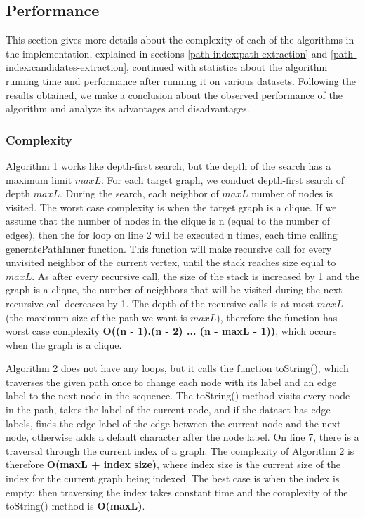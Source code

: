 \documentclass{l4proj}
\theoremstyle{definition}
\begin{document}
\subsection{Performance}
This section gives more details about the complexity of each of the algorithms in the implementation, explained in sections \ref{path-index:path-extraction} and \ref{path-index:candidates-extraction}, continued with statistics about the algorithm running time and performance after running it on various datasets. Following the results obtained, we make a conclusion about the observed performance of the algorithm and analyze its advantages and disadvantages.\par
\subsubsection{Complexity}
\label{path-index:complexity}
Algorithm 1 works like depth-first search, but the depth of the search has a maximum limit $maxL$. For each target graph, we conduct depth-first search of depth $maxL$. During the search, each neighbor of $maxL$ number of nodes is visited. The worst case complexity is when the target graph is a clique. If we assume that the number of nodes in the clique is n (equal to the number of edges), then the for loop on line 2 will be executed n times, each time calling \textrm{generatePathInner} function. This function will make recursive call for every unvisited neighbor of the current vertex, until the stack reaches size equal to $maxL$. As after every recursive call, the size of the stack is increased by 1 and the graph is a clique, the number of neighbors that will be visited during the next recursive call decreases by 1. The depth of the recursive calls is at most $maxL$ (the maximum size of the path we want  is $maxL$), therefore the function has worst case complexity \textbf{O((n - 1).(n - 2) ... (n - maxL - 1))}, which occurs when the graph is a clique. \par
 Algorithm 2 does not have any loops, but it calls the function \textrm{toString()}, which traverses the given path once to change each node with its label and an edge label to the next node in the sequence. The \textrm{toString()} method visits every node in the path, takes the label of the current node, and if the dataset has edge labels, finds the edge label of the edge between the current node and the next node, otherwise adds a default character after the node label. On line 7, there is a traversal through the current index of a graph. The complexity of Algorithm 2 is therefore \textbf{O(maxL + index size)}, where index size is the current size of the index for the current graph being indexed. The best case is when the index is empty: then traversing the index takes constant time and the complexity of the \textrm{toString()} method is \textbf{O(maxL)}.\par
\end{document}
